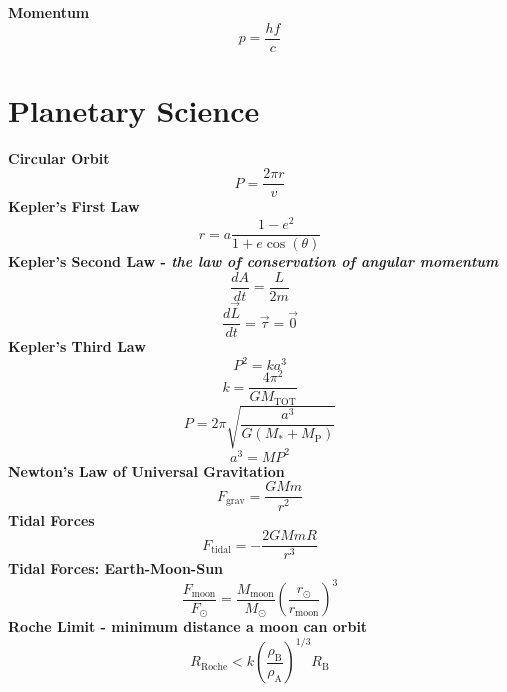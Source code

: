 \documentclass{spy}
\begin{document}
\textbf {Momentum}
\begin{equation}
p = \frac {hf}{c}
\end{equation}

\newpage

\section {Planetary Science}

\textbf {Circular Orbit}
\begin{equation}
P = \frac{2 \pi r}{v}
\end{equation}
\textbf {Kepler's First Law}
\begin{equation}
r = a \frac{1 - e^2}{1 + e \cos(\theta)}
\end{equation}
\textbf {Kepler's Second Law - \textit{the law of conservation of angular momentum}}
\begin{equation}
\frac{dA}{dt} = \frac{L}{2m}
\end{equation}
\begin{equation}
\frac{d\vec{L}}{dt} = \vec{\tau} = \vec{0}
\end{equation}
\textbf {Kepler's Third Law}
\begin{equation} \label{K3L_basic}
P^2 = k a^3
\end{equation}
\begin{equation} \label{K3L_constant}
k = \frac {4 \pi^2} {G M_\mathrm{TOT}} 
\end{equation}
\begin{equation}
P = 2 \pi \sqrt{\frac{a^3}{G (M_\mathrm{*} + M_\mathrm{P})}}
\end{equation}
\begin{equation}
a^3 = M P^2
\end{equation}
\textbf {Newton's Law of Universal Gravitation}
\begin{equation}
F_\mathrm{grav} = \frac {GMm} {r^2}
\end{equation}
\textbf {Tidal Forces}
\begin{equation}
F_\mathrm{tidal} =  - \frac {2GMmR} {r^3}
\end{equation}
\textbf {Tidal Forces: Earth-Moon-Sun}
\begin{equation}
\frac{F_\mathrm{moon}}{F_\odot} = \frac{M_\mathrm{moon}}{M_\odot} \left( \frac{r_\odot}{r_\mathrm{moon}} \right)^3
\end{equation}
\textbf {Roche Limit  - minimum distance a moon can orbit}
\begin{equation}
R_\mathrm{Roche} < k \left( \frac {\rho_\mathrm{B}} {\rho_\mathrm{A}} \right)^{1/3} R_\mathrm{B}
\end{equation}
\end{document}
